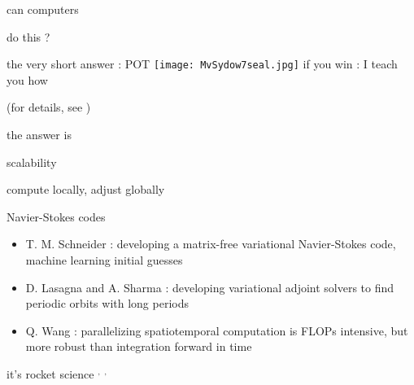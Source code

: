 \begin{frame}{can computers}

\vfill

{\Huge
do this ?
                  }
\vfill
\end{frame}

\begin{frame}{the very short answer : POT}
\texttt{[image: MvSydow7seal.jpg]}
\bigskip
if you win : I teach you how

\vfill\hfill (for details, see \wwwcb{})
\end{frame}

\begin{frame}{the answer is}

\vfill

{\Huge
scalability
                  }

\vfill

\end{frame}

\begin{frame}{compute locally, adjust globally}
\begin{block}{Navier-Stokes codes}
\begin{itemize}
 \item
T. M. Schneider : developing a matrix-free variational Navier-Stokes code,
machine learning initial guesses
 \item
D. Lasagna and A. Sharma  : developing variational adjoint solvers to
find periodic orbits with long periods
 \item
Q. Wang : parallelizing {\color{red}spatiotemporal}
computation is FLOPs intensive, but more robust than
integration forward in time
\end{itemize}
\end{block}

\vfill\hfill
it's rocket science%
$^,$%
$^,$%
\end{frame}

